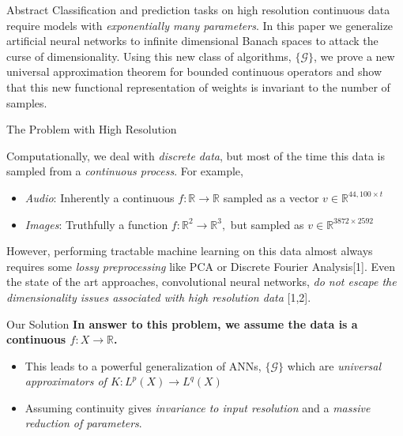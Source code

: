 
\begin{alertblock}{Abstract}
Classification and prediction tasks
on high resolution continuous data require models with \emph{exponentially many parameters}.
 In this paper we generalize artificial neural networks to infinite dimensional Banach spaces to attack the curse of dimensionality. Using this new class of algorithms, $\{\mathcal{G}\}$, 
we prove a new universal approximation theorem for bounded continuous operators and show that this new functional representation
of weights is invariant to the number of samples.
\end{alertblock}


\begin{block}{The Problem with High Resolution}

Computationally, we deal with \emph{discrete data}, but most of the time this data is sampled from a \emph{continuous process}. For example,
\begin{itemize}
	\item \emph{Audio}: Inherently a continuous $f: \mathbb{R} \to \mathbb{R}$ sampled as a vector $v \in \mathbb{R}^{44,100\times t}$
	\item \emph{Images}: Truthfully a function $f: \mathbb{R}^2 \to \mathbb{R}^3,$ but sampled as $v \in \mathbb{R}^{3872\times 2592}$
\end{itemize}
However, performing tractable machine learning on this data almost always requires some \emph{lossy preprocessing} like PCA or Discrete Fourier Analysis[1]. Even the state of the art approaches, convolutional neural networks, \emph{do not escape the dimensionality issues associated with high resolution data} [1,2]. \\[1cm]
\end{block}

\begin{block}{Our Solution}
\textbf{In answer to this problem, we assume the data is a continuous $f: X \to \mathbb{R}$.}
\begin{itemize}
	\item This leads to a powerful generalization of ANNs, $\{\mathcal{G}\}$ which are \emph{universal approximators of $K: L^p(X) \to L^q(X)$}
	\item Assuming continuity gives \emph{invariance to input resolution} and a \emph{massive reduction of parameters}.
\end{itemize}
\end{block}
